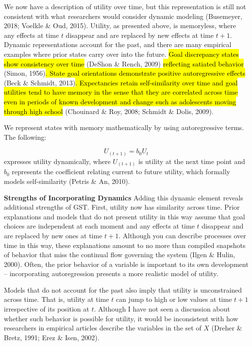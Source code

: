 \documentclass[english,,man]{apa6}
\theoremstyle{definition}
\theoremstyle{definition}
\theoremstyle{definition}
\theoremstyle{remark}
\begin{document}
We now have a description of utility over time, but this representation
is still not consistent with what researchers would consider dynamic
modeling (Busemeyer, 2018; Voelkle \& Oud, 2015). Utility, as presented
above, is memoryless, where any effects at time \(t\) disappear and are
replaced by new effects at time \(t+1\). Dynamic representations account
for the past, and there are many empirical examples where prior states
carry over into the future.
\hl{Goal discrepancy states show consistency over time} (DeShon \&
Rench, 2009) \hl{reflecting satiated behavior }(Simon,
1956)\hl{. State goal orientations demonstrate positive autoregressive effects }(Beck
\& Schmidt,
2013)\hl{. Expectancies retain self-similarity over time and goal utilities tend to have memory in the sense that they are correlated across time even in periods of known development and change such as adolescents moving through high school }(Chouinard
\& Roy, 2008; Schmidt \& Dolis, 2009).

We represent states with memory mathematically by using autoregressive
terms. The following:

\begin{equation}
U_{(t+1)} = b_0 U_{t}
\end{equation} \noindent expresses utility dynamically, where
\(U_{(t+1)}\) is utility at the next time point and \(b_0\) represents
the coefficient relating current to future utility, which formally
models self-similarity (Petris \& An, 2010).

\textbf{Strengths of Incorporating Dynamics} Adding this dynamic element
reveals additional strengths of GST. First, utility now has similarity
across time. Prior explanations and models that do not present utility
in this way assume that goal choices are independent at each moment and
any effects at time \(t\) disappear and are replaced by new ones at time
\(t+1\). Although you can describe processes over time in this way,
these explanations amount to no more than compiled snapshots of behavior
that miss the continual flow governing the system (Ilgen \& Hulin,
2000). Often, the prior behavior of a variable is important to its own
development -- incorporating autoregression presents a more realistic
model of utility.

Models that do not account for the past also imply that utility is
unconstrained across time. That is, utility at time \(t\) can jump to
high or low values at time \(t+1\) irrespective of its position at
\(t\). Although I have not seen a discussion about whether such behavior
is possible for utility, it would be inconsistent with how researchers
in empirical articles describe the variables in the set of \(X\) (Dreher
\& Bretz, 1991; Erez \& Isen, 2002).
\end{document}
